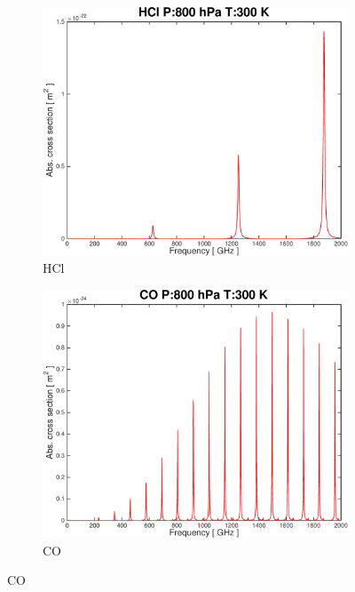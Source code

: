 \documentclass[paper=a4, fontsize=11pt]{scrartcl} %
\begin{document}
\begin{figure}[t!]
    \centering
    \begin{subfigure}[t]{0.45\textwidth}
        \includegraphics[width=\textwidth]{plots/plot_xsec_HCl_800hPa_300K.pdf}
        \caption{HCl}
    \end{subfigure}
    \begin{subfigure}[t]{0.45\textwidth}
        \includegraphics[width=\textwidth]{plots/plot_xsec_CO_800hPa_300K.pdf}
        \caption{CO}
    \end{subfigure}


\end{figure}
\end{document}
